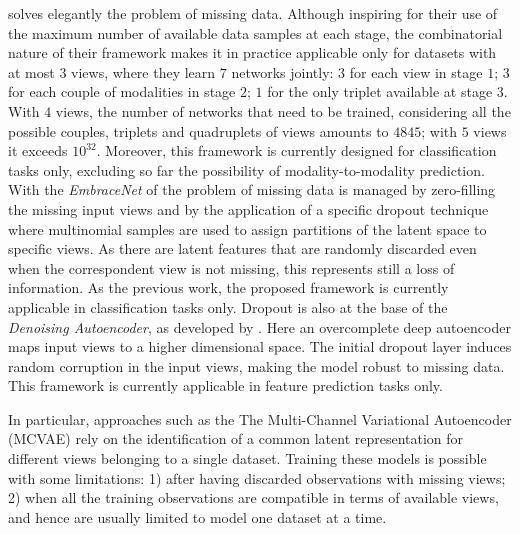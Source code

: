 solves elegantly the problem of missing data.
Although inspiring for their use of the maximum number of available data samples at each stage,
the combinatorial nature of their framework makes it in practice applicable only for datasets with at most $3$ views, where they learn $7$ networks jointly:
$3$ for each view in stage $1$;
$3$ for each couple of modalities in stage $2$;
$1$ for the only triplet available at stage $3$.
With $4$ views, the number of networks that need to be trained, considering all the possible couples, triplets and quadruplets of views amounts to $4845$;
with $5$ views it exceeds $10^{32}$. 
Moreover, this framework is currently designed for classification tasks only, excluding so far the possibility of modality-to-modality prediction.
With the \textit{EmbraceNet} of \cite{embracenet} the problem of missing data is managed by zero-filling the missing input views and by the application of a specific dropout technique where multinomial samples are used to assign partitions of the latent space to specific views.
As there are latent features that are randomly discarded even when the correspondent view is not missing, this represents still a loss of information.
As the previous work, the proposed framework is currently applicable in classification tasks only.
Dropout is also at the base of the \textit{Denoising Autoencoder}, as developed by \cite{dae}.
Here an overcomplete deep autoencoder maps input views to a higher dimensional space.
The initial dropout layer induces random corruption in the input views, making the model robust to missing data.
This framework is currently applicable in feature prediction tasks only.

In particular, approaches such as the The Multi-Channel Variational Autoencoder (MCVAE) \citep{Antelmi2019} rely on the identification of a common latent representation for different views belonging to a single dataset.
Training these models is possible with some limitations:
1) after having discarded observations with missing views;
2) when all the training observations are compatible in terms of available views, and hence are usually limited to model one dataset at a time.

